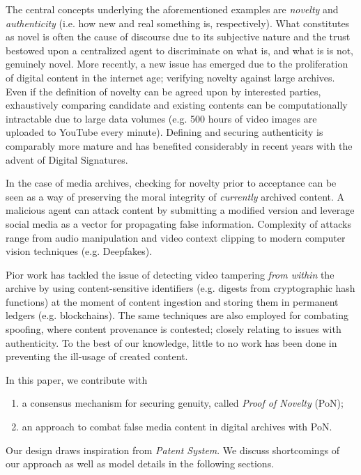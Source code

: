 \documentclass[conference]{IEEEtran}
\begin{document}
    The central concepts underlying the aforementioned examples are \emph{novelty} and \emph{authenticity} (i.e. how new and real something is, respectively). What constitutes as novel is often the cause of discourse due to its subjective nature and the trust bestowed upon a centralized agent to discriminate on what is, and what is is not, genuinely novel. More recently, a new issue has emerged due to the proliferation of digital content in the internet age; verifying novelty against large archives. Even if the definition of novelty can be agreed upon by interested parties, exhaustively comparing candidate and existing contents can be computationally intractable due to large data volumes (e.g. 500 hours of video images are uploaded to YouTube every minute). Defining and securing authenticity is comparably more mature and has benefited considerably in recent years with the advent of Digital Signatures.

In the case of media archives, checking for novelty prior to acceptance can be seen as a way of preserving the moral integrity of \emph{currently} archived content. A malicious agent can attack content by submitting a modified version and leverage social media as a vector for propagating false information. Complexity of attacks range from audio manipulation and video context clipping to modern computer vision techniques (e.g. Deepfakes). 

Pior work has tackled the issue of detecting video tampering \emph{from within} the archive by using content-sensitive identifiers (e.g. digests from cryptographic hash functions) at the moment of content ingestion and storing them in permanent ledgers (e.g. blockchains). The same techniques are also employed for combating spoofing, where content provenance is contested; closely relating to issues with authenticity. To the best of our knowledge, little to no work has been done in preventing the ill-usage of created content.

In this paper, we contribute with

\begin{enumerate}
    \item a consensus mechanism for securing genuity, called \emph{Proof of Novelty} (PoN);
    \item an approach to combat false media content in digital archives with PoN.
\end{enumerate}

Our design draws inspiration from \emph{Patent System}. We discuss shortcomings of our approach as well as model details in the following sections.
\end{document}
